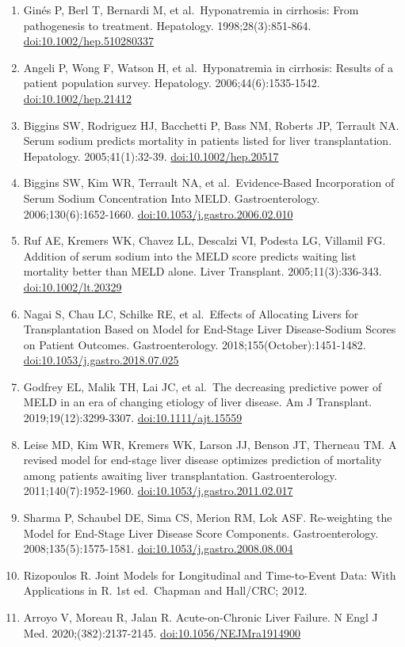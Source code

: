 \documentclass[11pt,english,]{book} %
\begin{document}
\begin{enumerate}
\item
  Ginés P, Berl T, Bernardi M, et al.~Hyponatremia in cirrhosis: From pathogenesis to treatment. Hepatology. 1998;28(3):851-864. \url{doi:10.1002/hep.510280337}
\item
  Angeli P, Wong F, Watson H, et al.~Hyponatremia in cirrhosis: Results of a patient population survey. Hepatology. 2006;44(6):1535-1542. \url{doi:10.1002/hep.21412}
\item
  Biggins SW, Rodriguez HJ, Bacchetti P, Bass NM, Roberts JP, Terrault NA. Serum sodium predicts mortality in patients listed for liver transplantation. Hepatology. 2005;41(1):32-39. \url{doi:10.1002/hep.20517}
\item
  Biggins SW, Kim WR, Terrault NA, et al.~Evidence-Based Incorporation of Serum Sodium Concentration Into MELD. Gastroenterology. 2006;130(6):1652-1660. \url{doi:10.1053/j.gastro.2006.02.010}
\item
  Ruf AE, Kremers WK, Chavez LL, Descalzi VI, Podesta LG, Villamil FG. Addition of serum sodium into the MELD score predicts waiting list mortality better than MELD alone. Liver Transplant. 2005;11(3):336-343. \url{doi:10.1002/lt.20329}
\item
  Nagai S, Chau LC, Schilke RE, et al.~Effects of Allocating Livers for Transplantation Based on Model for End-Stage Liver Disease-Sodium Scores on Patient Outcomes. Gastroenterology. 2018;155(October):1451-1482. \url{doi:10.1053/j.gastro.2018.07.025}
\item
  Godfrey EL, Malik TH, Lai JC, et al.~The decreasing predictive power of MELD in an era of changing etiology of liver disease. Am J Transplant. 2019;19(12):3299-3307. \url{doi:10.1111/ajt.15559}
\item
  Leise MD, Kim WR, Kremers WK, Larson JJ, Benson JT, Therneau TM. A revised model for end-stage liver disease optimizes prediction of mortality among patients awaiting liver transplantation. Gastroenterology. 2011;140(7):1952-1960. \url{doi:10.1053/j.gastro.2011.02.017}
\item
  Sharma P, Schaubel DE, Sima CS, Merion RM, Lok ASF. Re-weighting the Model for End-Stage Liver Disease Score Components. Gastroenterology. 2008;135(5):1575-1581. \url{doi:10.1053/j.gastro.2008.08.004}
\item
  Rizopoulos R. Joint Models for Longitudinal and Time-to-Event Data: With Applications in R. 1st ed.~Chapman and Hall/CRC; 2012.
\item
  Arroyo V, Moreau R, Jalan R. Acute-on-Chronic Liver Failure. N Engl J Med. 2020;(382):2137-2145. \url{doi:10.1056/NEJMra1914900}

\end{enumerate}
\end{document}
